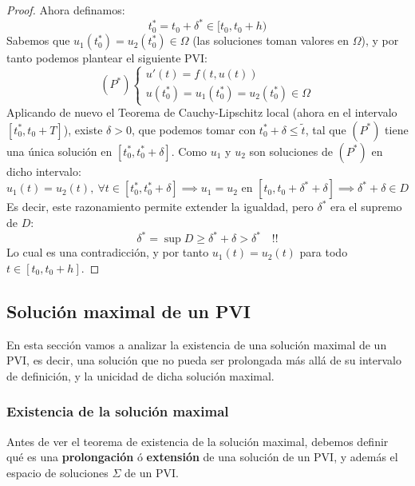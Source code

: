 \begin{proof}
    Ahora definamos:
    \[
        t_0^* = t_0 + \delta^* \in [t_0, t_0 + h)
    \]
    Sabemos que $u_1(t_0^*) = u_2(t_0^*) \in \Omega$ (las soluciones toman valores en $\Omega$), y por tanto podemos plantear el siguiente PVI:
    \[
        (P^*)
        \begin{cases}
            u'(t) = f(t, u(t)) \\
            u(t_0^*) = u_1(t_0^*) = u_2(t_0^*) \in \Omega
        \end{cases}
    \]
    Aplicando de nuevo el Teorema de Cauchy-Lipschitz local (ahora en el intervalo $[t_0^*, t_0 + T]$), existe $\delta > 0$, que podemos tomar con $t_0^* + \delta \leq \widetilde{t}$, tal que $(P^*)$ tiene una única solución en $[t_0^*, t_0^* + \delta]$. Como $u_1$ y $u_2$ son soluciones de $(P^*)$ en dicho intervalo:
    \[
        u_1(t) = u_2(t), \ \forall t \in [t_0^*, t_0^* + \delta]
        \implies
        u_1 = u_2 \text{ en } [t_0, t_0 + \delta^* + \delta]
        \implies
        \delta^* + \delta \in D
    \]
    Es decir, este razonamiento permite extender la igualdad, pero $\delta^*$ era el supremo de $D$:
    \[
        \delta^* = \sup D \geq \delta^* + \delta > \delta^* \quad !!
    \]
    Lo cual es una contradicción, y por tanto $u_1(t) = u_2(t)$ para todo $t \in [t_0, t_0 + h]$.
\end{proof}

\subsection{Solución maximal de un PVI}
En esta sección vamos a analizar la existencia de una solución maximal de un PVI, es decir, una solución que no pueda ser prolongada más allá de su intervalo de definición, y la unicidad de dicha solución maximal.\\

\subsubsection{Existencia de la solución maximal}

Antes de ver el teorema de existencia de la solución maximal, debemos definir qué es una \textbf{prolongación} ó \textbf{extensión} de una solución de un PVI, y además el espacio de soluciones $\Sigma$ de un PVI.

